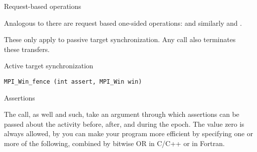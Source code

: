  {Request-based operations}

Analogous to  there are request based one-sided operations:
%
%
and similarly  and .

These only apply to passive target synchronization.
Any  call also terminates these transfers.

 {Active target synchronization}

\begin{verbatim}
MPI_Win_fence (int assert, MPI_Win win)
\end{verbatim}

 {Assertions}
\label{sec:mpi-assert}

The  call, as well  and such, take an argument
through which assertions can be passed about the activity before, after, and during the epoch.
The value zero is always allowed, by you can make your program more efficient by specifying
one or more of the following, combined by bitwise OR in C/C++ or
 in Fortran.

